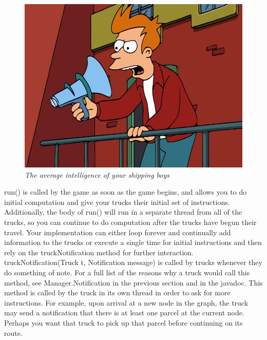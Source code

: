 \documentclass[11pt]{article}
\begin{document}
\begin{figure}[h]
\centerline{\includegraphics[scale=0.4]{fry.jpg}} 
\caption{\em{The average intelligence of your shipping boys}}
\end{figure}

run() is called by the game as soon as the game begins, and allows you to do initial computation and give your trucks their initial set of instructions. Additionally, the body of run() will run in a separate thread from all of the trucks, so you can continue to do computation after the trucks have begun their travel. Your implementation can either loop forever and continually add information to the trucks or execute a single time for initial instructions and then rely on the truckNotification method for further interaction.\\

truckNotification(Truck t, Notification message) is called by trucks whenever they do something of note. For a full list of the reasons why a truck would call this method, see Manager.Notification in the previous section and in the javadoc. This method is called by the truck in its own thread in order to ask for more instructions. For example, upon arrival at a new node in the graph, the truck may send a notification that there is at least one parcel at the current node. Perhaps you want that truck to pick up that parcel before continuing on its route.

\newpage
\end{document}
